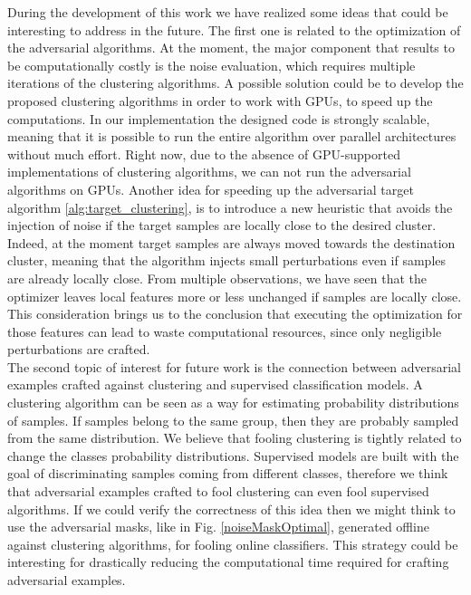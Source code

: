 During the development of this work we have realized some ideas that could be interesting to address in the future. The first one is related to the optimization of the adversarial algorithms. At the moment, the major component that results to be computationally costly is the noise evaluation, which requires multiple iterations of the clustering algorithms. A possible solution could be to develop the proposed clustering algorithms in order to work with GPUs, to speed up the computations. In our implementation the designed code is strongly scalable, meaning that it is possible to run the entire algorithm over parallel architectures without much effort. Right now, due to the absence of GPU-supported implementations of clustering algorithms, we can not run the adversarial algorithms on GPUs. Another idea for speeding up the adversarial target algorithm \ref{alg:target_clustering}, is to introduce a new heuristic that avoids the injection of noise if the target samples are locally close to the desired cluster. Indeed, at the moment target samples are always moved towards the destination cluster, meaning that the algorithm injects small perturbations even if samples are already locally close. From multiple observations, we have seen that the optimizer leaves local features more or less unchanged if samples are locally close. This consideration brings us to the conclusion that executing the optimization for those features can lead to waste computational resources, since only negligible perturbations are crafted.\\
The second topic of interest for future work is the connection between adversarial examples crafted against clustering and supervised classification models. A clustering algorithm can be seen as a way for estimating probability distributions of samples. If samples belong to the same group, then they are probably sampled from the same distribution. We believe that fooling clustering is tightly related to change the classes probability distributions. Supervised models are built with the goal of discriminating samples coming from different classes, therefore we think that adversarial examples crafted to fool clustering can even fool supervised algorithms. If we could verify the correctness of this idea then we might think to use the adversarial masks, like in Fig. \ref{noiseMaskOptimal}, generated offline against clustering algorithms, for fooling online classifiers. This strategy could be interesting for drastically reducing the computational time required for crafting adversarial examples. 
